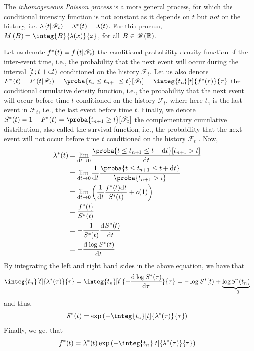 The \textit{inhomogeneous Poisson process} is a more general process, for which the conditional intensity function is not constant as it depends on $t$ but \textit{not} on the history, i.e. ${\lambda\left( t \middle| \mathscr{F}_t \right) = \lambda^*(t) = \lambda(t)}$.
For this process, $M\pars{B} = \integ{B}{\lambda(x)}{x}$, for all $B \in \mathscr{B}\left( \mathbb{R} \right)$.

Let us denote $f^*(t) = f\left( t \middle| \mathscr{F}_t \right)$ the conditional probability density function of the inter-event time, i.e., the probability that the next event will occur during the interval $\left[ t \, ; t+\mathrm{d} t \right)$ conditioned on the history $\mathscr{F}_t$.
Let us also denote $F^*(t) = F\pars{t \middle| \mathscr{F}_t} = \proba{t_n \leq t_{n+1} \leq t}[\mathscr{F}_t] =  \integ{t_{n}}[t]{f^*(\tau)}{\tau}$ the conditional cumulative density function, i.e., the probability that the next event will occur before time $t$ conditioned on the history $\mathscr{F}_t$, where here $t_n$ is the last event in $\mathscr{F}_t$, i.e., the last event before time $t$.
Finally, we denote $S^*(t) = 1 - F^*(t) = \proba{t_{n+1} \geq t}[\mathscr{F}_t]$ the complementary cumulative distribution, also called the survival function, i.e., the probability that the next event will not occur before time $t$ conditioned on the history $\mathscr{F}_t$ \citep{de2019temporal}.
Now,
\begin{equation}
    \begin{split}
        \lambda^*(t) &= \lim_{\dint t \to 0} \frac{\proba{t\leq t_{n+1} \leq t+\dint t}[t_{n+1} > t]}{\dint t} \\
        &= \lim_{\dint t \to 0} \frac{1}{\dint t} \frac{\proba{t\leq t_{n+1} \leq t+\dint t}}{\proba{t_{n+1} > t}} \\
        &= \lim_{\dint t \to 0} \pars{\frac{1}{\dint t}\frac{f^*(t)\dint t}{S^*(t)} + o(1)} \\
        &= \frac{f^*(t)}{S^*(t)} \\
        &= - \frac{1}{S^*(t)} \deriv{S^*(t)}{t} \\
        &= -\deriv{\log S^*(t)}{t}
    \end{split}
\end{equation}
By integrating the left and right hand sides in the above equation, we have that
\begin{equation}
    \integ{t_n}[t]{\lambda^*(\tau)}{\tau} = \integ{t_n}[t]{-\deriv{\log S^*(\tau)}{\tau}}{\tau} = -\log S^*(t) + \underbrace{\log S^*(t_n)}_{=0}
\end{equation}
and thus,
\begin{equation}
    S^*(t) = \e{- \integ{t_n}[t]{\lambda^*(\tau)}{\tau}}
\end{equation}
Finally, we get that
\begin{equation}\label{eq:f_star_res}
    f^*(t) = \lambda^*(t) \e{- \integ{t_n}[t]{\lambda^*(\tau)}{\tau}}
\end{equation}

